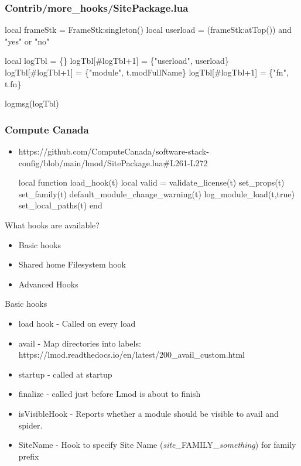 \documentclass{beamer}
\begin{document}
\begin{frame}[fragile]
  \frametitle{Contrib/more\_hooks/SitePackage.lua}
    {\small
\begin{semiverbatim}
  local frameStk = FrameStk:singleton()
  local userload = (frameStk:atTop()) and
                   "yes" or "no"

  local logTbl       = \{\}
  logTbl[\#logTbl+1]  = \{"userload", userload\}
  logTbl[\#logTbl+1]  = \{"module", t.modFullName\}
  logTbl[\#logTbl+1]  = \{"fn", t.fn\}

  logmsg(logTbl)
\end{semiverbatim}
    }
\end{frame}

\begin{frame}[fragile]
  \frametitle{Compute Canada}
  \begin{itemize}
    \item https://github.com/ComputeCanada/software-stack-config/blob/main/lmod/SitePackage.lua\#L261-L272
    {\small
\begin{semiverbatim}
     local function load\_hook(t)
        local valid = validate\_license(t)
        set\_props(t)
        set\_family(t)
        default\_module\_change\_warning(t)
        log\_module\_load(t,true)
        set\_local\_paths(t)
     end
\end{semiverbatim}
    }
    \end{itemize}
\end{frame}

\begin{frame}{What hooks are available?}
  \begin{itemize}
    \item Basic hooks
    \item Shared home Filesystem hook
    \item Advanced Hooks
  \end{itemize}
\end{frame}

\begin{frame}{Basic hooks}
  \begin{itemize}
    \item load hook - Called on every load
    \item avail - Map directories into labels: https://lmod.readthedocs.io/en/latest/200\_avail\_custom.html
    \item startup - called at startup
    \item finalize - called just before Lmod is about to finish
    \item isVisibleHook - Reports whether a module should be visible
      to avail and spider.
    \item SiteName - Hook to specify Site Name (\emph{site}\_FAMILY\_\emph{something}) for family prefix
  \end{itemize}
\end{frame}
\end{document}
